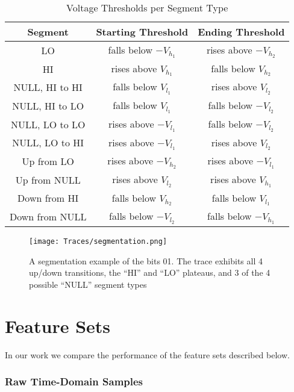 \documentclass[conference]{IEEEtran}
\begin{document}
  \begin{table}
    \caption{Voltage Thresholds per Segment Type}
    \label{tab:SegmentationLevels}
    \centering
    \begin{tabular}{|c c c|} 
      \hline
      Segment & Starting Threshold & Ending Threshold \\ [0.5ex] 
      \hline\hline
      LO & falls below $-V_{h_1}$ & rises above $-V_{h_2}$ \\
      \hline
      HI & rises above $V_{h_1}$ & falls below $V_{h_2}$ \\
      \hline
      NULL, HI to HI & falls below $V_{l_1}$ & rises above $V_{l_2}$ \\
      \hline
      NULL, HI to LO & falls below $V_{l_1}$ & falls below $-V_{l_2}$ \\
      \hline
      NULL, LO to LO & rises above $-V_{l_1}$ & falls below $-V_{l_2}$ \\
      \hline
      NULL, LO to HI & rises above $-V_{l_1}$ & rises above $V_{l_2}$ \\
      \hline
      Up from LO & rises above $-V_{h_2}$ & rises above $-V_{l_1}$ \\
      \hline
      Up from NULL & rises above $V_{l_2}$ & rises above $V_{h_1}$ \\
      \hline
      Down from HI & falls below $V_{h_2}$ & falls below $V_{l_1}$ \\
      \hline
      Down from NULL & falls below $-V_{l_2}$ & falls below $-V_{h_1}$ \\
      \hline
    \end{tabular}
  \end{table}
  
  \begin{figure}[t]
    \centering
    \texttt{[image: Traces/segmentation.png]}
    \caption{A segmentation example of the bits 01. The trace exhibits all 4 up/down transitions, the ``HI'' and ``LO'' plateaus, and 3 of the 4 possible ``NULL'' segment types}
    \label{fig:SegmentationTrace}
  \end{figure}
  
\section{Feature Sets} \label{FeatureSets}
  In our work we compare the performance of the feature sets described below.
  
\subsubsection{Raw Time-Domain Samples}
\end{document}
